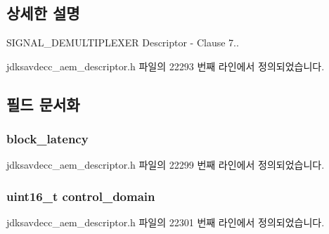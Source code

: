 \subsection{상세한 설명}
S\+I\+G\+N\+A\+L\+\_\+\+D\+E\+M\+U\+L\+T\+I\+P\+L\+E\+X\+ER Descriptor -\/ Clause 7.. 

jdksavdecc\+\_\+aem\+\_\+descriptor.\+h 파일의 22293 번째 라인에서 정의되었습니다.



\subsection{필드 문서화}
\subsubsection[{\texorpdfstring{block\+\_\+latency}{block_latency}}]{ block\+\_\+latency}\hypertarget{structjdksavdecc__descriptor__signal__demultiplexer_ae2e9f0088d5e900b610d1b2818dfc559}{}\label{structjdksavdecc__descriptor__signal__demultiplexer_ae2e9f0088d5e900b610d1b2818dfc559}


jdksavdecc\+\_\+aem\+\_\+descriptor.\+h 파일의 22299 번째 라인에서 정의되었습니다.

\subsubsection[{\texorpdfstring{control\+\_\+domain}{control_domain}}]{\setlength{\rightskip}{0pt plus 5cm}uint16\+\_\+t control\+\_\+domain}\hypertarget{structjdksavdecc__descriptor__signal__demultiplexer_a8937b22996b7c28ae209f29fe777f03a}{}\label{structjdksavdecc__descriptor__signal__demultiplexer_a8937b22996b7c28ae209f29fe777f03a}


jdksavdecc\+\_\+aem\+\_\+descriptor.\+h 파일의 22301 번째 라인에서 정의되었습니다.

